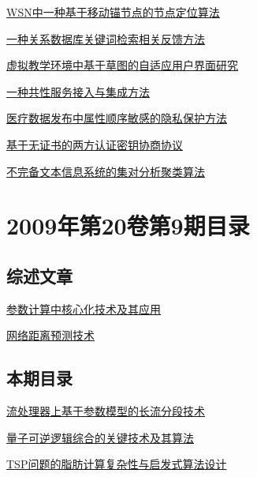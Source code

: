 \documentclass[a4paper]{article}
\begin{document}
\href{http://www.jos.org.cn/ch/reader/download_pdf.aspx?file_no=09032&year_id=2009&quarter_id=zk&falg=1}{WSN中一种基于移动锚节点的节点定位算法}

\href{http://www.jos.org.cn/ch/reader/download_pdf.aspx?file_no=09033&year_id=2009&quarter_id=zk&falg=1}{一种关系数据库关键词检索相关反馈方法}

\href{http://www.jos.org.cn/ch/reader/download_pdf.aspx?file_no=09034&year_id=2009&quarter_id=zk&falg=1}{虚拟教学环境中基于草图的自适应用户界面研究}

\href{http://www.jos.org.cn/ch/reader/download_pdf.aspx?file_no=09035&year_id=2009&quarter_id=zk&falg=1}{一种共性服务接入与集成方法}

\href{http://www.jos.org.cn/ch/reader/download_pdf.aspx?file_no=09036&year_id=2009&quarter_id=zk&falg=1}{医疗数据发布中属性顺序敏感的隐私保护方法}

\href{http://www.jos.org.cn/ch/reader/download_pdf.aspx?file_no=09037&year_id=2009&quarter_id=zk&falg=1}{基于无证书的两方认证密钥协商协议}

\href{http://www.jos.org.cn/ch/reader/download_pdf.aspx?file_no=09038&year_id=2009&quarter_id=zk&falg=1}{不完备文本信息系统的集对分析聚类算法}


\section{\textbf{2009年第20卷第9期目录}}
\subsection{综述文章}
\href{http://www.jos.org.cn/ch/reader/download_pdf.aspx?file_no=3593&year_id=2009&quarter_id=9&falg=1}{参数计算中核心化技术及其应用}

\href{http://www.jos.org.cn/ch/reader/download_pdf.aspx?file_no=3559&year_id=2009&quarter_id=9&falg=1}{网络距离预测技术}

\subsection{本期目录}
\href{http://www.jos.org.cn/ch/reader/download_pdf.aspx?file_no=3406&year_id=2009&quarter_id=9&falg=1}{流处理器上基于参数模型的长流分段技术}

\href{http://www.jos.org.cn/ch/reader/download_pdf.aspx?file_no=3407&year_id=2009&quarter_id=9&falg=1}{量子可逆逻辑综合的关键技术及其算法}

\href{http://www.jos.org.cn/ch/reader/download_pdf.aspx?file_no=3418&year_id=2009&quarter_id=9&falg=1}{TSP问题的脂肪计算复杂性与启发式算法设计}
\end{document}

